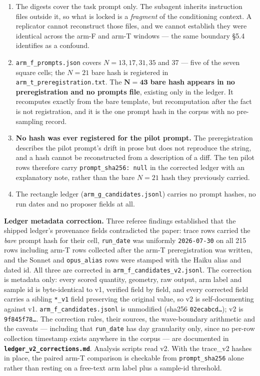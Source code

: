 \documentclass[11pt]{article}
\begin{document}
\begin{enumerate}
\item The digests cover the task prompt only. The subagent inherits instruction files outside it,
   so what is locked is a \textit{fragment} of the conditioning context. A replicator cannot
   reconstruct those files, and we cannot establish they were identical across the arm-F and
   arm-T windows --- the same boundary \S5.4 identifies as a confound.
\item \texttt{arm\_f\_prompts.json} covers $N = 13, 17, 31, 35$ and 37 --- five of the seven square cells; the
   $N = 21$ bare hash is registered in \texttt{arm\_t\_preregistration.txt}. The \textbf{$\boldsymbol{N = 43}$ bare hash appears
   in no preregistration and no prompts file}, existing only in the ledger. It recomputes
   exactly from the bare template, but recomputation after the fact is not registration, and it
   is the one prompt hash in the corpus with no pre-sampling record.
\item \textbf{No hash was ever registered for the pilot prompt.} The preregistration describes the pilot
   prompt's drift in prose but does not reproduce the string, and a hash cannot be reconstructed
   from a description of a diff. The ten pilot rows therefore carry \texttt{prompt\_sha256: null} in the
   corrected ledger with an explanatory note, rather than the bare $N = 21$ hash they previously
   carried.
\item The rectangle ledger (\texttt{arm\_g\_candidates.jsonl}) carries no prompt hashes, no run dates and no
   proposer fields at all.
\end{enumerate}

\textbf{Ledger metadata correction.} Three referee findings established that the shipped ledger's
provenance fields contradicted the paper: trace rows carried the \textit{bare} prompt hash for their
cell, \texttt{run\_date} was uniformly \texttt{2026-07-30} on all 215 rows including arm-T rows collected after
the arm-T preregistration was written, and the Sonnet and \texttt{opus\_alias} rows were stamped with
the Haiku alias and dated id. All three are corrected in \texttt{arm\_f\_candidates\_v2.jsonl}. The
correction is metadata only: every scored quantity, geometry, raw output, arm label and sample
id is byte-identical to v1, verified field by field, and every corrected field carries a sibling
\texttt{*\_v1} field preserving the original value, so v2 is self-documenting against v1.
\texttt{arm\_f\_candidates.jsonl} is unmodified (sha256 \texttt{02ecabcd\dots}); v2 is \texttt{9f845f78\dots}. The correction
rules, their sources, the wave-boundary arithmetic and the caveats --- including that \texttt{run\_date}
has day granularity only, since no per-row collection timestamp exists anywhere in the corpus ---
are documented in \textbf{\texttt{ledger\_v2\_corrections.md}}. Analysis scripts read v2. With the trace\_v2
hashes in place, the paired arm-T comparison is checkable from \texttt{prompt\_sha256} alone rather than
resting on a free-text arm label plus a sample-id threshold.
\end{document}
